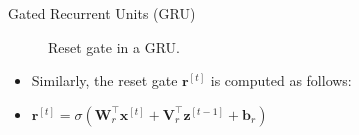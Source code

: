 \begin{vbframe}{Gated Recurrent Units (GRU)}
    \begin{figure}
      \centering
      \caption{\footnotesize{Reset gate in a GRU.}}
  \end{figure}
  \begin{itemize}
    \item Similarly, the reset gate $\mathbf{r}^{[t]}$ is computed as follows:
   \item $\mathbf{r}^{[t]} = \sigma(\mathbf{W}_{r}^\top \mathbf{x}^{[t]} +\mathbf{V}_{r}^\top \mathbf{z}^{[t-1]} + \mathbf{b}_r)$

  \end{itemize}
\end{vbframe}

